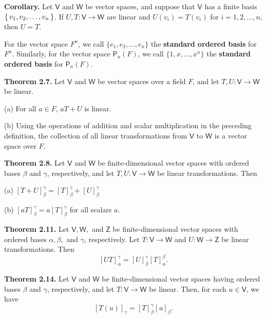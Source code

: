 \documentclass{article}
\newcommand{\0}{\mathit{0}}
\begin{document}
\medskip

\textbf{Corollary.} Let $\mathsf{V}$ and $\mathsf{W}$ be vector spaces, and suppose that
$\mathsf{V}$ has a finite basis $\set{v_1, v_2, \dots, v_n}$.
If $U, T: \mathsf{V} \to \mathsf{W}$ are linear and $U(v_i) = T(v_i)$ for
$i = 1, 2, \dots, n$, then $U = T$.

\medskip

For the vector space $F^n$, we call $\{e_1, e_2, \dots, e_n\}$ the
\textbf{standard ordered basis} for $F^n$. Similarly, for the vector space $\mathsf{P}_n(F)$,
we call $\{1, x, \dots, x^n\}$ the \textbf{standard ordered basis} for $\mathsf{P}_n(F)$.

\medskip

\textbf{Theorem 2.7.} Let $\mathsf{V}$ and $\mathsf{W}$ be vector spaces over a field $F$,
and let $T, U: \mathsf{V} \to \mathsf{W}$ be linear.

(a) For all $a \in F$, $aT + U$ is linear.

(b) Using the operations of addition and scalar multiplication in the preceding
definition, the collection of all linear transformations from $\mathsf{V}$ to
$\mathsf{W}$ is a vector space over $F$.

\medskip

\textbf{Theorem 2.8.} Let $\mathsf{V}$ and $\mathsf{W}$ be finite-dimensional vector spaces
with ordered bases $\beta$ and $\gamma$, respectively, and let $T, U: \mathsf{V} \to \mathsf{W}$
be linear transformations. Then

(a) $\left[ T + U \right]^\gamma_\beta = \left[ T \right]^\gamma_\beta + \left[ U \right]^\gamma_\beta$

(b) $\left[ aT \right]^\gamma_\beta = a \left[ T \right]^\gamma_\beta$ for all scalars $a$.

\medskip

\textbf{Theorem 2.11.} Let $\mathsf{V}, \mathsf{W},$ and $\mathsf{Z}$ be finite-dimensional vector spaces
with ordered bases $\alpha, \beta,$ and $\gamma$, respectively. Let
$T: \mathsf{V} \to \mathsf{W}$ and $U: \mathsf{W} \to \mathsf{Z}$ be linear transformations.
Then
\[
    \left[ UT \right]^\gamma_\alpha = \left[ U \right]^\gamma_\beta \left[ T \right]^\beta_\alpha.
\]

\medskip

\textbf{Theorem 2.14.} Let $\mathsf{V}$ and $\mathsf{W}$ be finite-dimensional vector spaces
having ordered bases $\beta$ and $\gamma$, respectively, and let
$T: \mathsf{V} \to \mathsf{W}$ be linear.
Then, for each $u \in \mathsf{V}$, we have
\[
    \left[ T(u) \right]_\gamma = \left[ T \right]^\gamma_\beta \left[ u \right]_\beta.
\]
\end{document}
